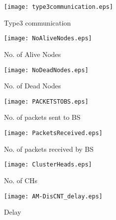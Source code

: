 \documentclass[journal]{IEEEtran}
\begin{document}
\begin{figure}[ht]
\begin{center}
\texttt{[image: type3communication.eps]}
\caption{Type3 communication }
\end{center}
\end{figure}


\begin{figure}[ht]
\begin{center}
\texttt{[image: NoAliveNodes.eps]}
\vspace{-0.7cm}
\caption{No. of Alive Nodes}
\end{center}
\end{figure}

\begin{figure}[ht]
\begin{center}
\texttt{[image: NoDeadNodes.eps]}
\vspace{-0.7cm}
\caption{No. of Dead Nodes}
\end{center}
\end{figure}

\begin{figure}[ht]
\begin{center}
\texttt{[image: PACKETSTOBS.eps]}
\vspace{-0.7cm}
\caption{No. of packets sent to BS}
\end{center}
\end{figure}

\begin{figure}[ht]
\begin{center}
\texttt{[image: PacketsReceived.eps]}
\vspace{-0.7cm}
\caption{No. of packets received by BS}
\end{center}
\end{figure}

\begin{figure}[ht]
\begin{center}
\texttt{[image: ClusterHeads.eps]}
\vspace{-0.7cm}
\caption{No. of CHs}
\end{center}
\end{figure}

\begin{figure}[ht]
\begin{center}
\texttt{[image: AM-DisCNT\_delay.eps]}
\vspace{-0.7cm}
\caption{Delay}
\end{center}
\end{figure}
\end{document}
